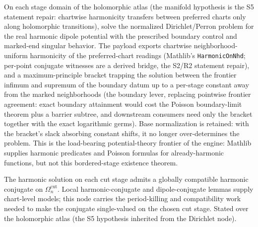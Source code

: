 \begin{lemma}
\label{lem:stage-dirichlet-harmonic-exists}
On each stage domain of the holomorphic atlas (the manifold hypothesis is the
S5 statement repair: chartwise harmonicity transfers between preferred charts
only along holomorphic transitions), solve the normalized Dirichlet/Perron
problem for
the real harmonic dipole potential with the prescribed boundary control and
marked-end singular behavior.  The payload exports chartwise
neighborhood-uniform harmonicity of the preferred-chart readings (Mathlib's
\texttt{HarmonicOnNhd}; per-point conjugate witnesses are a derived bridge,
the S2/R2 statement repair), and a maximum-principle bracket trapping the
solution between the frontier infimum and supremum of the boundary datum up
to a per-stage constant away from the marked neighborhoods (the boundary
lever, replacing pointwise frontier agreement: exact boundary attainment
would cost the Poisson boundary-limit theorem plus a barrier subtree, and
downstream consumers need only the bracket together with the exact
logarithmic germs).  Base normalization is retained: with the bracket's
slack absorbing constant shifts, it no longer over-determines the problem.
This is the load-bearing
potential-theory frontier of the engine: Mathlib supplies harmonic predicates
and Poisson formulas for already-harmonic functions, but not this
bordered-stage existence theorem.
\end{lemma}

\begin{lemma}
\label{lem:stage-harmonic-conjugate-exists-on-cut}
The harmonic solution on each cut stage admits a globally compatible harmonic
conjugate on \(\Omega_n^{\mathrm{cut}}\).  Local harmonic-conjugate and
dipole-conjugate lemmas supply chart-level models; this node carries the
period-killing and compatibility work needed to make the conjugate
single-valued on the chosen cut stage.  Stated over the holomorphic atlas
(the S5 hypothesis inherited from the Dirichlet node).
\end{lemma}

